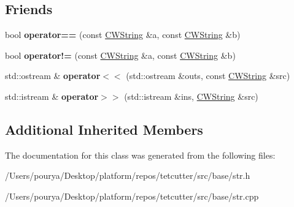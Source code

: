 \subsection*{Friends}
\begin{DoxyCompactItemize}
\item 
\hypertarget{classps_1_1CWString_a088804404b2bd2cc784eb7efab6e8352}{}bool {\bfseries operator==} (const \hyperlink{classps_1_1CWString}{C\+W\+String} \&a, const \hyperlink{classps_1_1CWString}{C\+W\+String} \&b)\label{classps_1_1CWString_a088804404b2bd2cc784eb7efab6e8352}

\item 
\hypertarget{classps_1_1CWString_a4b138b6163fa871754420174beaceafe}{}bool {\bfseries operator!=} (const \hyperlink{classps_1_1CWString}{C\+W\+String} \&a, const \hyperlink{classps_1_1CWString}{C\+W\+String} \&b)\label{classps_1_1CWString_a4b138b6163fa871754420174beaceafe}

\item 
\hypertarget{classps_1_1CWString_a6270ea1b8ae876bceffcece540cfc43a}{}std\+::ostream \& {\bfseries operator$<$$<$} (std\+::ostream \&outs, const \hyperlink{classps_1_1CWString}{C\+W\+String} \&src)\label{classps_1_1CWString_a6270ea1b8ae876bceffcece540cfc43a}

\item 
\hypertarget{classps_1_1CWString_acabf840c60b48242da8d70df900f393d}{}std\+::istream \& {\bfseries operator$>$$>$} (std\+::istream \&ins, \hyperlink{classps_1_1CWString}{C\+W\+String} \&src)\label{classps_1_1CWString_acabf840c60b48242da8d70df900f393d}

\end{DoxyCompactItemize}
\subsection*{Additional Inherited Members}


The documentation for this class was generated from the following files\+:\begin{DoxyCompactItemize}
\item 
/\+Users/pourya/\+Desktop/platform/repos/tetcutter/src/base/str.\+h\item 
/\+Users/pourya/\+Desktop/platform/repos/tetcutter/src/base/str.\+cpp\end{DoxyCompactItemize}
